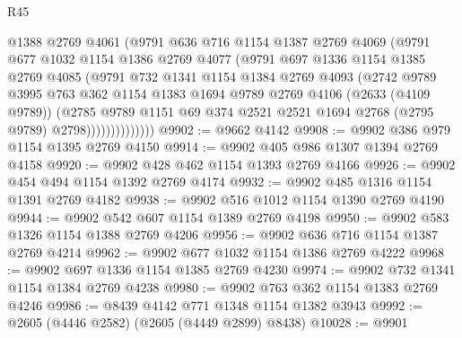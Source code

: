 \begin{lexlean}{R45}
\begin{coremodule}
                    @1388
                    @2769
                    @4061
                    (@9791
                      @636
                      @716
                      @1154
                      @1387
                      @2769
                      @4069
                      (@9791
                        @677
                        @1032
                        @1154
                        @1386
                        @2769
                        @4077
                        (@9791
                          @697
                          @1336
                          @1154
                          @1385
                          @2769
                          @4085
                          (@9791
                            @732
                            @1341
                            @1154
                            @1384
                            @2769
                            @4093
                            (@2742
                              @9789
                              @3995
                              @763
                              @362
                              @1154
                              @1383
                              @1694
                              @9789
                              @2769
                              @4106
                              (@2633 (@4109 @9789))
                              (@2785
                                @9789
                                @1151
                                @69
                                @374
                                @2521
                                @2521
                                @1694
                                @2768
                                (@2795 @9789)
                                @2798))))))))))))))
@9902 := @9662 @4142
@9908 := @9902 @386 @979 @1154 @1395 @2769 @4150
@9914 := @9902 @405 @986 @1307 @1394 @2769 @4158
@9920 := @9902 @428 @462 @1154 @1393 @2769 @4166
@9926 := @9902 @454 @494 @1154 @1392 @2769 @4174
@9932 := @9902 @485 @1316 @1154 @1391 @2769 @4182
@9938 := @9902 @516 @1012 @1154 @1390 @2769 @4190
@9944 := @9902 @542 @607 @1154 @1389 @2769 @4198
@9950 := @9902 @583 @1326 @1154 @1388 @2769 @4206
@9956 := @9902 @636 @716 @1154 @1387 @2769 @4214
@9962 := @9902 @677 @1032 @1154 @1386 @2769 @4222
@9968 := @9902 @697 @1336 @1154 @1385 @2769 @4230
@9974 := @9902 @732 @1341 @1154 @1384 @2769 @4238
@9980 := @9902 @763 @362 @1154 @1383 @2769 @4246
@9986 := @8439 @4142 @771 @1348 @1154 @1382 @3943
@9992 := @2605 (@4446 @2582) (@2605 (@4449 @2899) @8438)
@10028 := @9901

\end{coremodule}
\end{lexlean}

